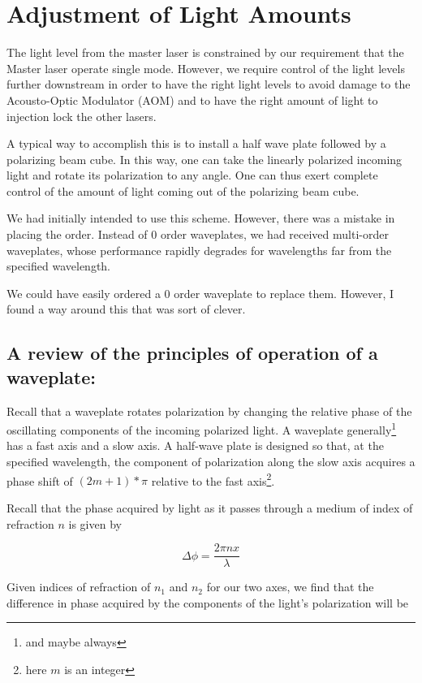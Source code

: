 
\section{Adjustment of Light Amounts}

The light level from the master laser is constrained by our requirement that the Master laser operate single mode. However, we require control of the light levels further downstream in order to have the right light levels to avoid damage to the Acousto-Optic Modulator (AOM) and to have the right amount of light to injection lock the other lasers. 

A typical way to accomplish this is to install a half wave plate followed by a polarizing beam cube. In this way, one can take the linearly polarized incoming light and rotate its polarization to any angle. One can thus exert complete control of the amount of light coming out of the polarizing beam cube. 

We had initially intended to use this scheme. However, there was a mistake in placing the order. Instead of 0 order waveplates, we had received multi-order waveplates, whose performance rapidly degrades for wavelengths far from the specified wavelength. 

We could have easily ordered a 0 order waveplate to replace them. However, I found a way around this that was sort of clever. 

\subsection{A review of the principles of operation of a waveplate: }

Recall that a waveplate rotates polarization by changing the relative phase of the oscillating components of the incoming polarized light. A waveplate generally\footnote{and maybe always} has a fast axis and a slow axis. A half-wave plate is designed so that, at the specified wavelength, the component of polarization along the slow axis acquires a phase shift of $(2m+1)*\pi$ relative to the fast axis\footnote{here $m$ is an integer}. 

Recall that the phase acquired by light as it passes through a medium of index of refraction $n$ is given by 

\begin{equation}
  \Delta \phi = \frac{2 \pi n x}{\lambda} \label{deltaPhi0}
\end{equation}

Given indices of refraction of $n_1$ and $n_2$ for our two axes, we find that the difference in phase acquired by the components of the light's polarization will be 

